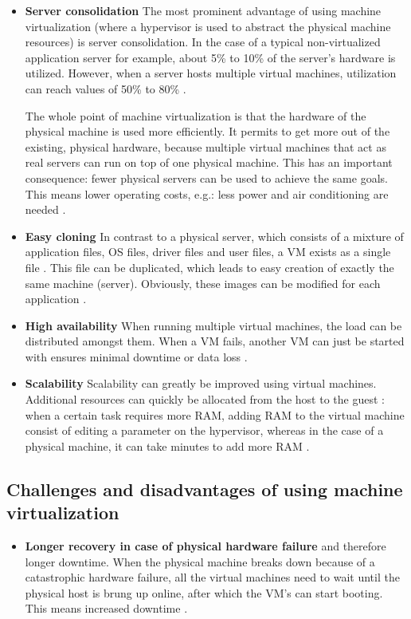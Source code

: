 \begin{itemize}
\item \textbf{Server consolidation} The most prominent advantage of using machine virtualization (where a hypervisor is used to abstract the physical machine resources) is server consolidation. In the case of a typical non-virtualized application server for example, about 5\% to 10\% of the server's hardware is utilized. However, when a server hosts multiple virtual machines, utilization can reach values of 50\% to 80\% \citep{Benefit1}.

The whole point of machine virtualization is that the hardware of the physical machine is used more efficiently. It permits to get more out of the existing, physical hardware, because multiple virtual machines that act as real servers can run on top of one physical machine. This has an important consequence: fewer physical servers can be used to achieve the same goals. This means lower operating costs, e.g.: less power and air conditioning are needed \citep{Benefit2}.
\item \textbf{Easy cloning} In contrast to a physical server, which consists of a mixture of application files, OS files, driver files and user files, a VM exists as a single file \citep{Benefit1}. This file can be duplicated, which leads to easy creation of exactly the same machine (server). Obviously, these images can be modified for each application \citep{Benefit3}.
\item \textbf{High availability} When running multiple virtual machines, the load can be distributed amongst them. When a VM fails, another VM can just be started with ensures minimal downtime or data loss \citep{Benefit3}.
\item \textbf{Scalability} Scalability can greatly be improved using virtual machines. Additional resources can quickly be allocated from the host to the guest \citep{Microsoft}: when a certain task requires more RAM, adding RAM to the virtual machine consist of editing a parameter on the hypervisor, whereas in the case of a physical machine, it can take minutes to add more RAM \citep{Benefit3}.
\end{itemize}

\subsection{Challenges and disadvantages of using machine virtualization}

\begin{itemize}
\item \textbf{Longer recovery in case of physical hardware failure} and therefore longer downtime. When the physical machine breaks down because of a catastrophic hardware failure, all the virtual machines need to wait until the physical host is brung up online, after which the VM's can start booting. This means increased downtime \citep{Benefit3}.
\end{itemize}


